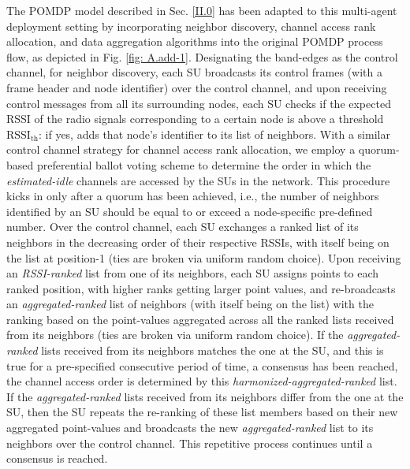 \documentclass[12pt, draftcls, onecolumn]{IEEEtran}
\begin{document}
The POMDP model described in Sec. \ref{II.0} has been adapted to this multi-agent deployment setting by incorporating neighbor discovery, channel access rank allocation, and data aggregation algorithms into the original POMDP process flow, as depicted in Fig. \ref{fig: A.add-1}. Designating the band-edges as the control channel, for neighbor discovery, each SU broadcasts its control frames (with a frame header and node identifier) over the control channel, and upon receiving control messages from all its surrounding nodes, each SU checks if the expected RSSI of the radio signals corresponding to a certain node is above a threshold $\text{RSSI}_\text{th}$: if yes, adds that node’s identifier to its list of neighbors. With a similar control channel strategy for channel access rank allocation, we employ a quorum-based preferential ballot voting scheme to determine the order in which the \emph{estimated-idle} channels are accessed by the SUs in the network. This procedure kicks in only after a quorum has been achieved, i.e., the number of neighbors identified by an SU should be equal to or exceed a node-specific pre-defined number. Over the control channel, each SU exchanges a ranked list of its neighbors in the decreasing order of their respective  RSSIs, with itself being on the list at position-1 (ties are broken via uniform random choice). Upon receiving an \emph{RSSI-ranked} list from one of its neighbors, each SU assigns points to each ranked position, with higher ranks getting larger point values, and re-broadcasts an \emph{aggregated-ranked} list of neighbors (with itself being on the list) with the ranking based on the point-values aggregated across all the ranked lists received from its neighbors (ties are broken via uniform random choice). If the \emph{aggregated-ranked} lists received from its neighbors matches the one at the SU, and this is true for a pre-specified consecutive period of time, a consensus has been reached, the channel access order is determined by this \emph{harmonized-aggregated-ranked} list. If the \emph{aggregated-ranked} lists received from its neighbors differ from the one at the SU, then  the SU repeats the re-ranking of these list members based on their new aggregated point-values and broadcasts the new \emph{aggregated-ranked} list to its neighbors over the control channel. This repetitive process continues until a consensus is reached.
\end{document}
